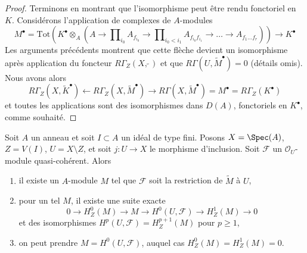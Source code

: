 \begin{proof}
\medskip\noindent
Terminons en montrant que l'isomorphisme peut être rendu fonctoriel en $K$.
Considérons l'application de complexes de $A$-modules
$$
M^\bullet = \text{Tot}\left(
K^\bullet \otimes_A
(A \to \prod\nolimits_{i_0} A_{f_{i_0}} \to
\prod\nolimits_{i_0 < i_1} A_{f_{i_0}f_{i_1}} \to
\ldots \to A_{f_1\ldots f_r})\right)
\longrightarrow
K^\bullet
$$
Les arguments précédents montrent que cette flèche devient un isomorphisme après
application du foncteur $R\Gamma_Z(X, \widetilde{\ })$ et que
$R\Gamma(U, \widetilde{M}^\bullet) = 0$ (détails omis). Nous avons alors
$$
R\Gamma_Z(X, \widetilde{K}^\bullet)
\leftarrow
R\Gamma_Z(X, \widetilde{M}^\bullet)
\rightarrow
R\Gamma(X, \widetilde{M}^\bullet) = M^\bullet = R\Gamma_Z(K^\bullet)
$$
et toutes les applications sont des isomorphismes dans $D(A)$, fonctoriels en $K^\bullet$,
comme souhaité.
\end{proof}

\begin{lemma}
\label{lemma-local-cohomology}
Soit $A$ un anneau et soit $I \subset A$ un idéal de type fini.
Posons $X = \Spec(A)$, $Z = V(I)$, $U = X \setminus Z$, et soit $j : U \to X$
le morphisme d'inclusion. Soit $\mathcal{F}$ un
$\mathcal{O}_U$-module quasi-cohérent. Alors
\begin{enumerate}
\item il existe un $A$-module $M$ tel que $\mathcal{F}$ soit la
restriction de $\widetilde{M}$ à $U$,
\item pour un tel $M$, il existe une suite exacte
$$
0 \to H^0_Z(M) \to M \to H^0(U, \mathcal{F}) \to H^1_Z(M) \to 0
$$
et des isomorphismes $H^p(U, \mathcal{F}) = H^{p + 1}_Z(M)$ pour $p \geq 1$,
\item on peut prendre $M = H^0(U, \mathcal{F})$, auquel cas
$H^0_Z(M) = H^1_Z(M) = 0$.
\end{enumerate}
\end{lemma}


